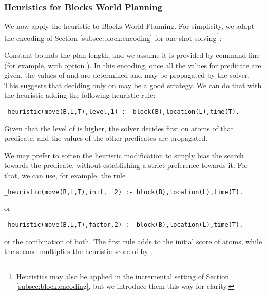 \subsubsection{Heuristics for Blocks World Planning}
\label{example:blocks:world:heuristic}
We now apply the  heuristic to Blocks World Planning.  
For simplicity, we adapt the encoding of Section \ref{subsec:block:encoding} 
for one-shot solving\footnote{Heuristics may also be applied in the incremental setting of 
Section \ref{subsec:block:encoding}, but we introduce them this way for clarity.}: 

Constant  bounds the plan length, and we assume it is provided by command line (for example, with option ).
%
%
In this encoding, once all the values for predicate  are given,
the values of  and  are determined and may be propagated by the solver.
This suggests that deciding only on  may be a good strategy.
We can do that with the  heuristic 
adding the following heuristic rule:

\begin{lstlisting}[basicstyle=\small\ttfamily,numbers=none]
_heuristic(move(B,L,T),level,1) :- block(B),location(L),time(T).
\end{lstlisting}
Given that the level of  is higher,  the solver 
decides first on atoms of that predicate,
and the values of the other predicates are propagated.

We may prefer to soften the heuristic modification to simply bias the search  towards the  predicate,
without establishing a strict preference towards it.  
For that, we can use, for example, the rule
\begin{lstlisting}[basicstyle=\small\ttfamily,numbers=none]
_heuristic(move(B,L,T),init,  2) :- block(B),location(L),time(T).
\end{lstlisting} 
or
\begin{lstlisting}[basicstyle=\small\ttfamily,numbers=none]
_heuristic(move(B,L,T),factor,2) :- block(B),location(L),time(T).
\end{lstlisting}
or the combination of both.  
The first rule adds  to the initial score of  atoms,
while the second multiplies the heuristic score of  by .

